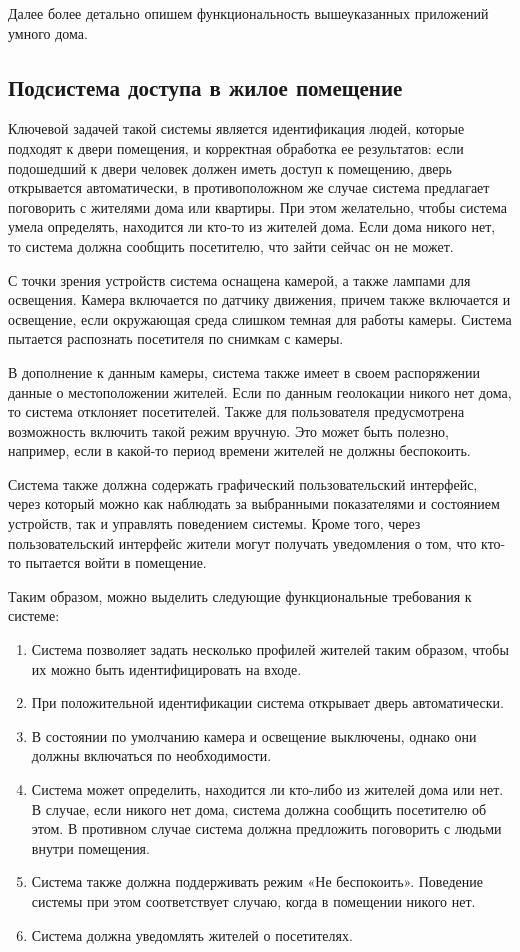 Далее более детально опишем функциональность вышеуказанных приложений умного дома.

\subsection{Подсистема доступа в жилое помещение}
Ключевой задачей такой системы является идентификация людей, которые подходят к двери помещения, и корректная обработка ее результатов: если подошедший к двери человек должен иметь доступ к помещению, дверь открывается автоматически, в противоположном же случае система предлагает поговорить с жителями дома или квартиры. При этом желательно, чтобы система умела определять, находится ли кто-то из жителей дома. Если дома никого нет, то система должна сообщить посетителю, что зайти сейчас он не может.

С точки зрения устройств система оснащена камерой, а также лампами для освещения. Камера включается по датчику движения, причем также включается и освещение, если окружающая среда слишком темная для работы камеры. Система пытается распознать посетителя по снимкам с камеры.

В дополнение к данным камеры, система также имеет в своем распоряжении данные о местоположении жителей. Если по данным геолокации никого нет дома, то система отклоняет посетителей. Также для пользователя предусмотрена возможность включить такой режим вручную. Это может быть полезно, например, если в какой-то период времени жителей не должны беспокоить.

Система также должна содержать графический пользовательский интерфейс, через который можно как наблюдать за выбранными показателями и состоянием устройств, так и управлять поведением системы. Кроме того, через пользовательский интерфейс жители могут получать уведомления о том, что кто-то пытается войти в помещение.

Таким образом, можно выделить следующие функциональные требования к системе:

\begin{enumerate}
	\item Система позволяет задать несколько профилей жителей таким образом, чтобы их можно быть идентифицировать на входе.
	\item При положительной идентификации система открывает дверь автоматически.
	\item В состоянии по умолчанию камера и освещение выключены, однако они должны включаться по необходимости.
	\item Система может определить, находится ли кто-либо из жителей дома или нет. В случае, если никого нет дома, система должна сообщить посетителю об этом. В противном случае система должна предложить поговорить с людьми внутри помещения.
	\item Система также должна поддерживать режим «Не беспокоить». Поведение системы при этом соответствует случаю, когда в помещении никого нет.
	\item Система должна уведомлять жителей о посетителях.
\end{enumerate}

